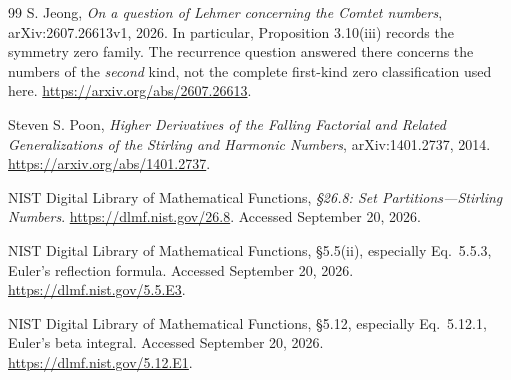 \documentclass[11pt,a4paper]{article}
\numberwithin{equation}{section}
\theoremstyle{definition}
\theoremstyle{remark}
\theoremstyle{plain}
\begin{document}
\begin{thebibliography}{99}
S. Jeong,
\emph{On a question of Lehmer concerning the Comtet numbers},
arXiv:2607.26613v1, 2026.
In particular, Proposition 3.10(iii) records the symmetry zero family.
The recurrence question answered there concerns the numbers of the
\emph{second} kind, not the complete first-kind zero classification used here.
\url{https://arxiv.org/abs/2607.26613}.

Steven S. Poon,
\emph{Higher Derivatives of the Falling Factorial and Related
Generalizations of the Stirling and Harmonic Numbers},
arXiv:1401.2737, 2014.
\url{https://arxiv.org/abs/1401.2737}.

NIST Digital Library of Mathematical Functions,
\emph{\S26.8: Set Partitions---Stirling Numbers}.
\url{https://dlmf.nist.gov/26.8}.
Accessed September 20, 2026.

NIST Digital Library of Mathematical Functions,
\S5.5(ii), especially Eq.~5.5.3, Euler's reflection formula.
Accessed September 20, 2026.
\url{https://dlmf.nist.gov/5.5.E3}.

NIST Digital Library of Mathematical Functions,
\S5.12, especially Eq.~5.12.1, Euler's beta integral.
Accessed September 20, 2026.
\url{https://dlmf.nist.gov/5.12.E1}.

\end{thebibliography}
\end{document}
